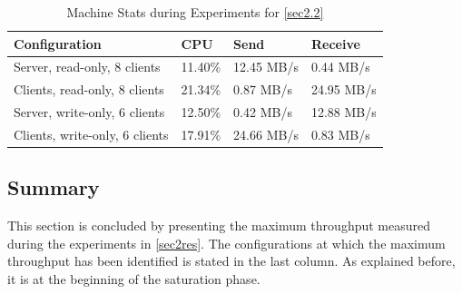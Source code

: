 \documentclass[11pt,a4paper]{article}
\begin{document}
\begin{center}
    \begin{table}
    	\begin{tabular}{|l|p{2cm}|p{2cm}|p{2cm}|}
            \hline \textbf{Configuration} & \textbf{CPU} & \textbf{Send} & \textbf{Receive}\\
            \hline Server, read-only, 8 clients & 11.40\%         & 12.45 MB/s    & 0.44 MB/s\\
            \hline Clients, read-only, 8 clients & 21.34\%           & 0.87 MB/s     & 24.95 MB/s\\
            \hline Server, write-only,  6 clients & 12.50\%        & 0.42 MB/s     & 12.88 MB/s\\
            \hline Clients, write-only, 6 clients & 17.91\%       & 24.66 MB/s     & 0.83 MB/s\\
            \hline
    	\end{tabular}
	\caption{Machine Stats during Experiments for \autoref{sec2.2}}
    \label{dstat:2-2}
	\end{table}
\end{center}



\subsection{Summary}
This section is concluded by presenting the maximum throughput measured during the experiments in \autoref{sec2res}. The configurations at which the maximum throughput has been identified is stated in the last column. As explained before, it is at the beginning of the saturation phase.
\end{document}
